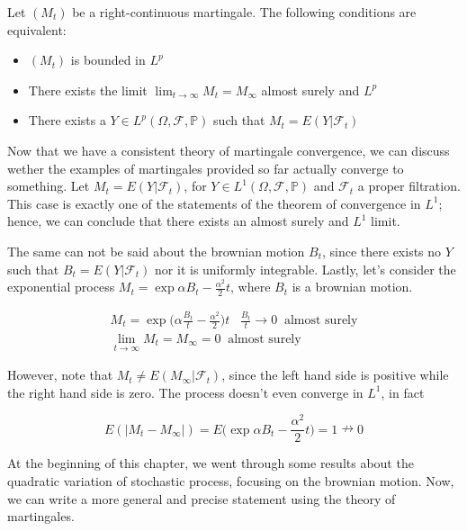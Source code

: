 \begin{theorem}[Convergence in $L^p$]
    Let $(M_t)$ be a right-continuous martingale. The following conditions are equivalent: 
    \begin{itemize}
        \item $(M_t)$ is bounded in $L^p$
        \item There exists the limit $\lim_{t \to \infty} M_t = M_{\infty}$ almost surely and $L^p$
        \item There exists a $Y \in L^p(\Omega, \mathcal{F}, \mathbb{P})$ such that $M_t = E(Y \vert \mathcal{F}_t)$
    \end{itemize}
\end{theorem}

Now that we have a consistent theory of martingale convergence, we can discuss wether the examples of martingales provided so far actually converge to something. Let $M_t = E(Y \vert \mathcal{F}_t)$, for $Y \in L^1(\Omega,\mathcal{F},\mathbb{P})$ and $\mathcal{F}_t$ a proper filtration. This case is exactly one of the statements of the theorem of convergence in $L^1$; hence, we can conclude that there exists an almost surely and $L^1$ limit. 

The same can not be said about the brownian motion $B_t$, since there exists no $Y$ such that $B_t = E(Y \vert \mathcal{F}_t)$ nor it is uniformly integrable. Lastly, let's consider the exponential process $M_t = \exp{\alpha B_t -\frac{\alpha^2}{2}t}$, where $B_t$ is a brownian motion. 

\begin{gather*}
    M_t = \exp{\Big(\alpha \frac{B_t}{t} -\frac{\alpha^2}{2}\Big)t} \;\;\; \frac{B_t}{t} \to 0 \;\; \text{almost surely} \\
    \lim_{t \to \infty} M_t = M_{\infty} = 0 \;\; \text{almost surely}
\end{gather*}

However, note that $M_t \neq E(M_{\infty} \vert \mathcal{F}_t)$, since the left hand side is positive while the right hand side is zero. The process doesn't even converge in $L^1$, in fact

\begin{equation*}
    E(\vert M_t - M_{\infty} \vert) = E\Big( \exp{\alpha B_t - \frac{\alpha^2}{2}t} \Big) = 1 \nrightarrow 0 
\end{equation*}

At the beginning of this chapter, we went through some results about the quadratic variation of stochastic process, focusing on the brownian motion. Now, we can write a more general and precise statement using the theory of martingales.

